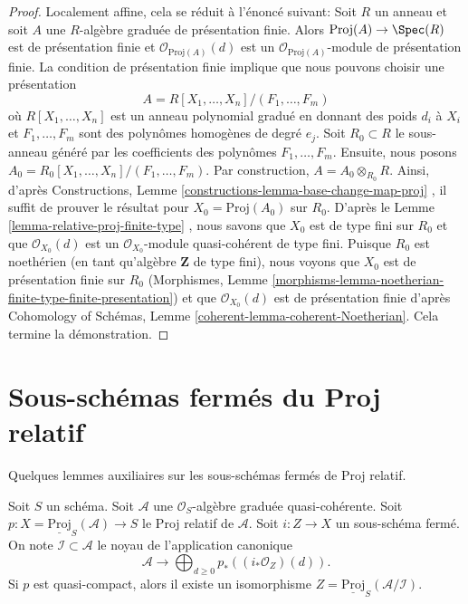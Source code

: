 \begin{proof}
Localement affine, cela se réduit à l'énoncé suivant: Soit  $R$  un anneau
et soit  $A$  une  $R$-algèbre graduée de présentation finie. Alors
 $\text{Proj}(A) \to \Spec(R)$  est de présentation finie et  $\mathcal{O}_{\text{Proj}(A)}(d)$  est un  $\mathcal{O}_{\text{Proj}(A)}$-module
de présentation finie. La condition de présentation finie implique que nous
pouvons choisir une présentation
$$
A = R[X_1, \ldots, X_n]/(F_1, \ldots, F_m)
$$
où  $R[X_1, \ldots, X_n]$  est un anneau polynomial gradué en donnant des poids  $d_i$ 
à  $X_i$  et  $F_1, \ldots, F_m$  sont des polynômes homogènes de degré  $e_j$.
Soit  $R_0 \subset R$  le sous-anneau généré par les coefficients des polynômes
 $F_1, \ldots, F_m$. Ensuite, nous posons  $A_0 = R_0[X_1, \ldots, X_n]/(F_1, \ldots, F_m)$. Par construction,  $A = A_0 \otimes_{R_0} R$.
Ainsi, d'après Constructions, Lemme  \ref{constructions-lemma-base-change-map-proj} , il suffit de prouver le résultat
pour  $X_0 = \text{Proj}(A_0)$  sur  $R_0$. D'après le Lemme  \ref{lemma-relative-proj-finite-type} , nous savons que
 $X_0$  est de type fini sur  $R_0$  et que  $\mathcal{O}_{X_0}(d)$  est un
 $\mathcal{O}_{X_0}$-module quasi-cohérent de type fini. Puisque  $R_0$  est
noethérien (en tant qu'algèbre  $\mathbf{Z}$ de type fini), nous voyons que
 $X_0$  est de présentation finie sur  $R_0$  (Morphismes, Lemme
 \ref{morphisms-lemma-noetherian-finite-type-finite-presentation}) et que  $\mathcal{O}_{X_0}(d)$  est de présentation finie d'après Cohomology of
Schémas, Lemme  \ref{coherent-lemma-coherent-Noetherian}. Cela termine la démonstration.
\end{proof}










\section{Sous-schémas fermés du Proj relatif}
\label{section-closed-in-relative-proj}

\noindent
Quelques lemmes auxiliaires sur les sous-schémas fermés de Proj relatif.

\begin{lemma}
\label{lemma-closed-subscheme-proj}
Soit  $S$  un schéma. Soit  $\mathcal{A}$  une  $\mathcal{O}_S$-algèbre graduée
quasi-cohérente. Soit  $p : X = \underline{\text{Proj}}_S(\mathcal{A}) \to S$  le Proj relatif de  $\mathcal{A}$. Soit
 $i : Z \to X$  un sous-schéma fermé. On note  $\mathcal{I} \subset \mathcal{A}$  le noyau de l'application
canonique
$$
\mathcal{A}
\longrightarrow
\bigoplus\nolimits_{d \geq 0} p_*\left((i_*\mathcal{O}_Z)(d)\right).
$$
Si  $p$  est quasi-compact, alors il existe un isomorphisme  $Z = \underline{\text{Proj}}_S(\mathcal{A}/\mathcal{I})$.
\end{lemma}

